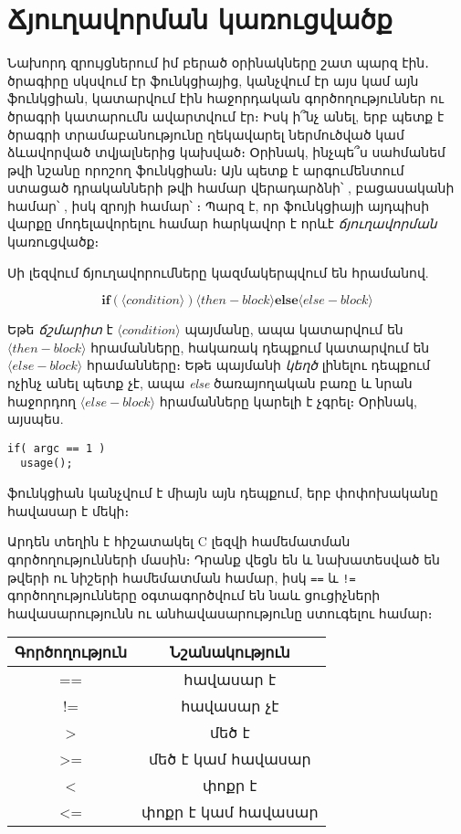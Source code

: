 \chapter{Ճյուղավորման կառուցվածք}

Նախորդ զրույցներում իմ բերած օրինակները շատ պարզ էին․ ծրագիրը սկսվում
էր  ֆունկցիայից, կանչվում էր այս կամ այն ֆունկցիան, կատարվում
էին հաջորդական գործողություններ ու ծրագրի կատարումն ավարտվում էր։ Իսկ
ի՞նչ անել, երբ պետք է ծրագրի տրամաբանությունը ղեկավարել ներմուծված կամ
ձևավորված տվյալներից կախված։ Օրինակ, ինչպե՞ս սահմանեմ թվի նշանը որոշող
 ֆունկցիան։ Այն պետք է արգումենտում ստացած դրականների թվի
համար վերադարձնի՝ , բացասականի համար՝ , իսկ զրոյի
համար՝ ։ Պարզ է, որ ֆունկցիայի այդպիսի վարքը մոդելավորելու համար  հարկավոր է որևէ \emph{ճյուղավորման} կառուցվածք։

Սի լեզվում ճյուղավորումները կազմակերպվում են  հրամանով.

\[
\mathbf{if}( \langle condition\rangle )
\langle then-block\rangle
\mathbf{else}
\langle else-block\rangle
\]

Եթե \emph{ճշմարիտ} է \(\langle condition\rangle\) պայմանը, ապա կատարվում
են \(\langle then-block\rangle\) հրամանները, հակառակ դեպքում կատարվում են
\(\langle else-block\rangle\) հրամանները։ Եթե պայմանի \emph{կեղծ} լինելու
դեպքում ոչինչ անել պետք չէ, ապա \emph{else} ծառայողական բառը և նրան հաջորդող
\(\langle else-block\rangle\) հրամանները կարելի է չգրել։ Օրինակ, այսպես.

\begin{Verbatim}
if( argc == 1 )
  usage();
\end{Verbatim}

 ֆունկցիան կանչվում է միայն այն դեպքում, երբ 
փոփոխականը հավասար է մեկի։

Արդեն տեղին է հիշատակել C լեզվի համեմատման գործողությունների մասին։ Դրանք
վեցն են և նախատեսված են թվերի ու նիշերի համեմատման համար, իսկ \verb|==| և
\verb|!=| գործողությունները օգտագործվում են նաև ցուցիչների հավասարությունն
ու անհավասարությունը ստուգելու համար։

\begin{center}
\begin{tabular}{c|c}
Գործողություն & Նշանակություն \\
\hline
== & հավասար է \\
!= & հավասար չէ \\
>  & մեծ է \\
>= & մեծ է կամ հավասար \\
<  & փոքր է \\
<= & փոքր է կամ հավասար \\
\end{tabular}
\end{center}

